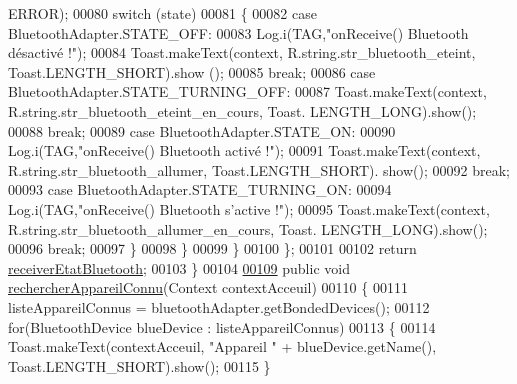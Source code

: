 \begin{DoxyCode}
      ERROR);
00080                     \textcolor{keywordflow}{switch} (state)
00081                     \{
00082                         \textcolor{keywordflow}{case} BluetoothAdapter.STATE\_OFF:
00083                             Log.i(TAG,\textcolor{stringliteral}{"onReceive() Bluetooth désactivé !"});
00084                             Toast.makeText(context, R.string.str\_bluetooth\_eteint, Toast.LENGTH\_SHORT).show
      ();
00085                             \textcolor{keywordflow}{break};
00086                         \textcolor{keywordflow}{case} BluetoothAdapter.STATE\_TURNING\_OFF:
00087                             Toast.makeText(context, R.string.str\_bluetooth\_eteint\_en\_cours, Toast.
      LENGTH\_LONG).show();
00088                             \textcolor{keywordflow}{break};
00089                         \textcolor{keywordflow}{case} BluetoothAdapter.STATE\_ON:
00090                             Log.i(TAG,\textcolor{stringliteral}{"onReceive() Bluetooth activé !"});
00091                             Toast.makeText(context, R.string.str\_bluetooth\_allumer, Toast.LENGTH\_SHORT).
      show();
00092                             \textcolor{keywordflow}{break};
00093                         \textcolor{keywordflow}{case} BluetoothAdapter.STATE\_TURNING\_ON:
00094                             Log.i(TAG,\textcolor{stringliteral}{"onReceive() Bluetooth s'active !"});
00095                             Toast.makeText(context, R.string.str\_bluetooth\_allumer\_en\_cours, Toast.
      LENGTH\_LONG).show();
00096                             \textcolor{keywordflow}{break};
00097                     \}
00098                 \}
00099             \}
00100         \};
00101 
00102         \textcolor{keywordflow}{return} \hyperlink{classcom_1_1lasalle_1_1io__trucks_1_1_communication_a4a45e2d6f9b84afa60b4a28b52f5a4bf}{receiverEtatBluetooth};
00103     \}
00104 
\hyperlink{classcom_1_1lasalle_1_1io__trucks_1_1_communication_a5e754807ead5e695279657bea324b5d7}{00109}     \textcolor{keyword}{public} \textcolor{keywordtype}{void} \hyperlink{classcom_1_1lasalle_1_1io__trucks_1_1_communication_a5e754807ead5e695279657bea324b5d7}{rechercherAppareilConnu}(Context contextAcceuil)
00110     \{
00111         listeAppareilConnus = bluetoothAdapter.getBondedDevices();
00112         \textcolor{keywordflow}{for}(BluetoothDevice blueDevice : listeAppareilConnus)
00113         \{
00114             Toast.makeText(contextAcceuil, \textcolor{stringliteral}{"Appareil "} + blueDevice.getName(), Toast.LENGTH\_SHORT).show();
00115         \}

\end{DoxyCode}
